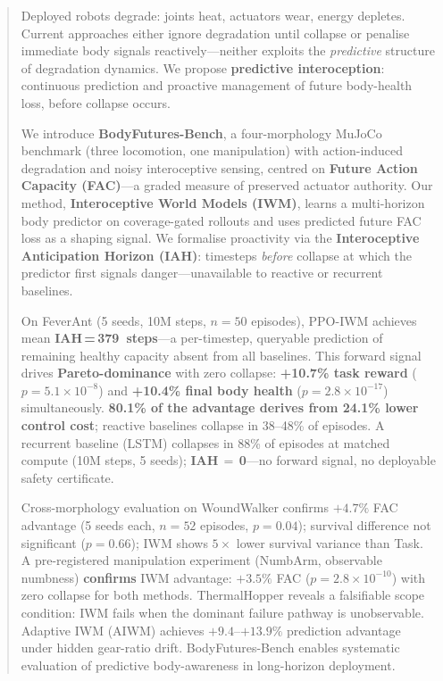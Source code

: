 \begin{abstract}
Deployed robots degrade: joints heat, actuators wear, energy depletes.
Current approaches either ignore degradation until collapse or penalise immediate body signals reactively---neither exploits the \emph{predictive} structure of degradation dynamics.
We propose \textbf{predictive interoception}: continuous prediction and proactive management of future body-health loss, before collapse occurs.

We introduce \textbf{BodyFutures-Bench}, a four-morphology MuJoCo benchmark (three locomotion, one manipulation) with action-induced degradation and noisy interoceptive sensing, centred on \textbf{Future Action Capacity (FAC)}---a graded measure of preserved actuator authority.
Our method, \textbf{Interoceptive World Models (IWM)}, learns a multi-horizon body predictor on coverage-gated rollouts and uses predicted future FAC loss as a shaping signal.
We formalise proactivity via the \textbf{Interoceptive Anticipation Horizon (IAH)}: timesteps \emph{before} collapse at which the predictor first signals danger---unavailable to reactive or recurrent baselines.

On FeverAnt (5 seeds, 10M steps, $n\!=\!50$ episodes), PPO-IWM achieves mean \textbf{IAH\,=\,379~steps}---a per-timestep, queryable prediction of remaining healthy capacity absent from all baselines.
This forward signal drives \textbf{Pareto-dominance} with zero collapse: \textbf{+10.7\% task reward} ($p\!=\!5.1{\times}10^{-8}$) and \textbf{+10.4\% final body health} ($p\!=\!2.8{\times}10^{-17}$) simultaneously.
\textbf{80.1\% of the advantage derives from 24.1\% lower control cost}; reactive baselines collapse in 38--48\% of episodes.
A recurrent baseline (LSTM) collapses in 88\% of episodes at matched compute (10M steps, 5 seeds); \textbf{IAH\,$=$\,0}---no forward signal, no deployable safety certificate.

Cross-morphology evaluation on WoundWalker confirms $+4.7\%$ FAC advantage (5 seeds each, $n\!=\!52$ episodes, $p\!=\!0.04$); survival difference not significant ($p\!=\!0.66$); IWM shows $5{\times}$ lower survival variance than Task.
A pre-registered manipulation experiment (NumbArm, observable numbness) \textbf{confirms} IWM advantage: $+3.5\%$ FAC ($p\!=\!2.8{\times}10^{-10}$) with zero collapse for both methods.
ThermalHopper reveals a falsifiable scope condition: IWM fails when the dominant failure pathway is unobservable.
Adaptive IWM (AIWM) achieves $+9.4$--$+13.9\%$ prediction advantage under hidden gear-ratio drift.
BodyFutures-Bench enables systematic evaluation of predictive body-awareness in long-horizon deployment.
\end{abstract}

